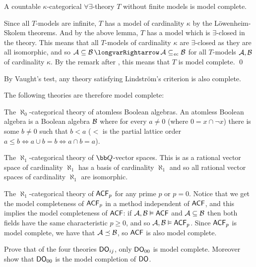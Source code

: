 \bthrm[title=Lindstr\"om's Criterion, name=lindstromcriterion]

    A countable $\kappa$-categorical $\forall\exists$-theory $T$ without finite models is model complete.

\ethrm

Since all $T$-models are infinite, $T$ has a model of cardinality $\kappa$ by the L\"owenheim-Skolem theorems.
And by the above lemma, $T$ has a model which is $\exists$-closed in the theory.
This means that all $T$-models of cardinality $\kappa$ are $\exists$-closed as they are all isomorphic, and so ${\cal A}\subseteq{\cal B}\implies{\cal A}\subseteq_{\it ec}{\cal B}$ for all $T$-models
${\cal A},{\cal B}$ of cardinality $\kappa$.
By the remark after , this means that $T$ is model complete.
\qed

By Vaught's test, any theory satisfying Lindstr\"om's criterion is also complete.

\bexam

    The following theories are therefore model complete:
    \benum
        \item The $\aleph_0$-categorical theory of atomless Boolean algebras.
        An atomless Boolean algebra is a Boolean algebra ${\cal B}$ where for every $a\neq0$ (where $0=x\cap\neg x$) there is some $b\neq0$ such that $b<a$ ($<$ is the partial lattice order
        $a\leq b\iff a\cup b=b\iff a\cap b=a$).
        \item The $\aleph_1$-categorical theory of ${\bb Q}$-vector spaces.
        This is as a rational vector space of cardinality $\aleph_1$ has a basis of cardinality $\aleph_1$ and so all rational vector spaces of cardinality $\aleph_1$ are isomorphic.
        \item The $\aleph_1$-categorical theory of ${\sf ACF}_p$ for any prime $p$ or $p=0$.
        Notice that we get the model completeness of ${\sf ACF}_p$ in a method independent of ${\sf ACF}$, and this implies the model completeness of ${\sf ACF}$: if ${\cal A},{\cal B}\vDash{\sf ACF}$
        and ${\cal A}\subseteq{\cal B}$ then both fields have the same characteristic $p\geq0$, and so ${\cal A},{\cal B}\vDash{\sf ACF}_p$.
        Since ${\sf ACF}_p$ is model complete, we have that ${\cal A}\preceq{\cal B}$, so ${\sf ACF}$ is also model complete.
    \eenum

\eexam

\bexerc

    Prove that of the four theories ${\sf DO}_{ij}$, only ${\sf DO}_{00}$ is model complete.
    Moreover show that ${\sf DO}_{00}$ is the model completion of ${\sf DO}$.

